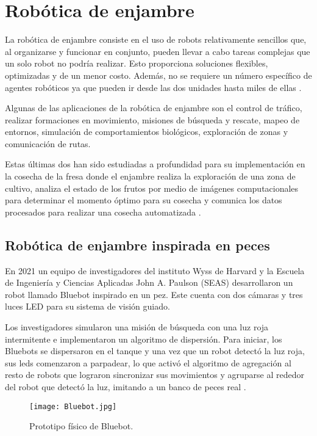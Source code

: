 \section{Robótica de enjambre}
La robótica de enjambre consiste en el uso de robots relativamente sencillos que, al organizarse y funcionar en conjunto, pueden llevar a cabo tareas complejas que un solo robot no podría realizar. Esto proporciona soluciones flexibles, optimizadas y de un menor costo. Además, no se requiere un número específico de agentes robóticos ya que pueden ir desde las dos unidades hasta miles de ellas \cite{UNIDIRswarm}.

Algunas de las aplicaciones de la robótica de enjambre son el control de tráfico, realizar formaciones en movimiento, misiones de búsqueda y rescate, mapeo de entornos, simulación de comportamientos biológicos, exploración de zonas y comunicación de rutas. 

Estas últimas dos han sido estudiadas a profundidad para su implementación en la cosecha de la fresa donde el enjambre realiza la exploración de una zona de cultivo, analiza el estado de los frutos por medio de imágenes computacionales para determinar el momento óptimo para su cosecha y comunica los datos procesados para realizar una cosecha automatizada \cite{EnjambresCultivos}.

\subsection{Robótica de enjambre inspirada en peces}
En 2021 un equipo de investigadores del instituto Wyss de Harvard y la Escuela de Ingeniería y Ciencias Aplicadas John A. Paulson (SEAS) desarrollaron un robot llamado Bluebot inspirado en un pez. Este cuenta con dos cámaras y tres luces LED para su sistema de visión guiado. 

Los investigadores simularon una misión de búsqueda con una luz roja intermitente e implementaron un algoritmo de dispersión. Para iniciar, los Bluebots se dispersaron en el tanque y una vez que un robot detectó la luz roja, sus leds comenzaron a parpadear, lo que activó el algoritmo de agregación al resto de robots que lograron sincronizar sus movimientos y agruparse al rededor del robot que detectó la luz, imitando a un banco de peces real \cite{Bluebot}.

\begin{figure}[H]
	\centering
	\texttt{[image: Bluebot.jpg]}
	\caption{Prototipo físico de Bluebot\cite{Bluebot}.}
	\label{fig:bluebot}
\end{figure}

